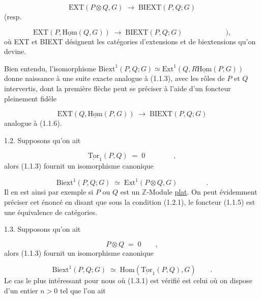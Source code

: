 \begin{equation}\tag{1.1.5}
\mathrm{EXT}(P\otimes Q,G) \;\longrightarrow\; \mathrm{BIEXT}(P,Q;G)
\end{equation}
(resp.

\begin{equation}\tag{1.1.6}
\mathrm{EXT}(P,\underline{\mathrm{Hom}}(Q,G)) \;\longrightarrow\; \mathrm{BIEXT}(P,Q;G) \qquad\qquad\qquad ),
\end{equation}
où EXT et BIEXT désignent les catégories d'extensions et de biextensions qu'on devine.

Bien entendu, l'isomorphisme $\mathrm{Biext}^1(P,Q;G) \simeq \mathrm{Ext}^1(Q,R\underline{\mathrm{Hom}}(P,G))$ donne naissance à une suite exacte analogue à (1.1.3), avec les rôles de $P$ et $Q$ intervertis, dont la première flèche peut se préciser à l'aide d'un foncteur pleinement fidèle

\begin{equation}\tag{1.1.7}
\mathrm{EXT}(Q,\underline{\mathrm{Hom}}(P,G)) \;\longrightarrow\; \mathrm{BIEXT}(P,Q;G)
\end{equation}
analogue à (1.1.6).

1.2.  Supposons qu'on ait

\begin{equation}\tag{1.2.1}
\underline{\mathrm{Tor}}_1(P,Q) \;=\; 0 \qquad\qquad ,
\end{equation}
alors (1.1.3) fournit un isomorphisme canonique

\begin{equation}\tag{1.2.2}
\mathrm{Biext}^1(P,Q;G) \;\simeq\; \mathrm{Ext}^1(P\otimes Q,G) \qquad\qquad .
\end{equation}
Il en est ainsi par exemple si $P$ ou $Q$ est un $\mathbb{Z}$-Module \underline{plat}. On peut évidemment préciser cet énoncé en disant que sous la condition (1.2.1), le foncteur
(1.1.5) est une équivalence de catégories.

1.3.  Supposons qu'on ait

\begin{equation}\tag{1.3.1}
P \otimes Q \;=\; 0 \qquad ,
\end{equation}
alors (1.1.3) fournit un isomorphisme canonique

\begin{equation}\tag{1.3.2}
\mathrm{Biext}^1(P,Q;G) \;\simeq\; \mathrm{Hom}(\underline{\mathrm{Tor}}_1(P,Q),G) \qquad .
\end{equation}
Le cas le plus intéressant pour nous où (1.3.1) est vérifié est celui où on dispose d'un entier $n > 0$ tel que l'on ait

